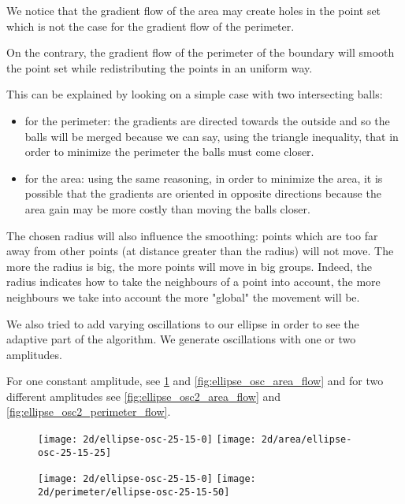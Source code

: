 We notice that the gradient flow of the area may create holes in the point set
which is not the case for the gradient flow of the perimeter.

On the contrary, the gradient flow of the perimeter of the boundary will smooth
the point set while redistributing the points in an uniform way.

This can be explained by looking on a simple case with two intersecting balls:
\begin{itemize}
    \item for the perimeter: the gradients are directed towards the outside
        and so the balls will be merged because we can say, using the triangle
        inequality, that in order to minimize the perimeter the balls must come
        closer.
    \item for the area: using the same reasoning, in order to minimize the area,
        it is possible that the gradients are oriented in opposite directions
        because the area gain may be more costly than moving the balls closer.
\end{itemize}

The chosen radius will also influence the smoothing: points which are too far
away from other points (at distance greater than the radius) will not move. The
more the radius is big, the more points will move in big groups. Indeed, the
radius indicates how to take the neighbours of a point into account, the more
neighbours we take into account the more "global" the movement will be.

We also tried to add varying oscillations to our ellipse in order to see the
adaptive part of the algorithm. We generate oscillations with one or two
amplitudes.

For one constant amplitude, see \ref{fig:ellipse_osc_perimeter_flow} and
\ref{fig:ellipse_osc_area_flow} and for two different amplitudes see
\ref{fig:ellipse_osc2_area_flow} and \ref{fig:ellipse_osc2_perimeter_flow}.

\begin{figure}[h]
    \centering

    \texttt{[image: 2d/ellipse-osc-25-15-0]}
    \texttt{[image: 2d/area/ellipse-osc-25-15-25]}
    \label{fig:ellipse_osc_area_flow}

    \texttt{[image: 2d/ellipse-osc-25-15-0]}
    \texttt{[image: 2d/perimeter/ellipse-osc-25-15-50]}
    \label{fig:ellipse_osc_perimeter_flow}
\end{figure}

